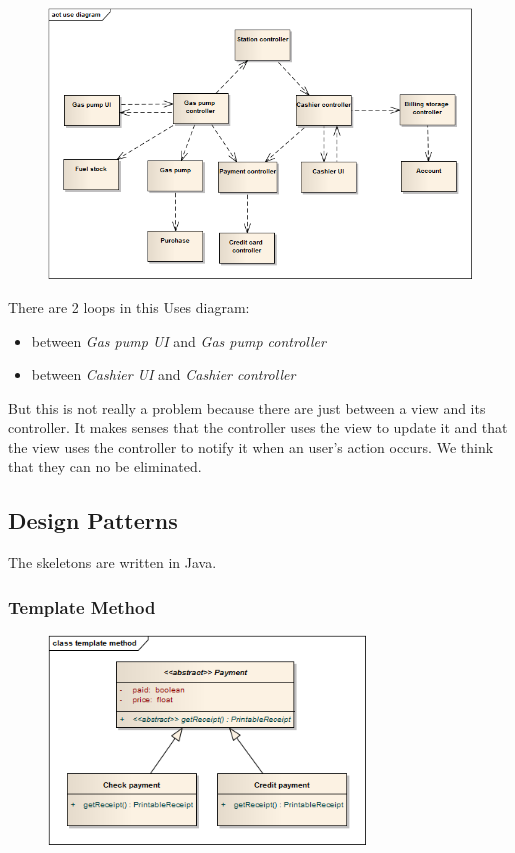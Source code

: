\begin{figure}[H]
 \centering
 \includegraphics[width=\textwidth]{../useDiagram.png}
\end{figure}
There are 2 loops in this Uses diagram:
\begin{itemize}
	\item between \textit{Gas pump UI} and \textit{Gas pump controller}
	\item between \textit{Cashier UI} and \textit{Cashier controller}
\end{itemize}
But this is not really a problem because there are just between a view and its controller. It makes senses that the controller uses the view to update it and that the view uses the controller to notify it when an user's action occurs. We think that they can no be eliminated.


\subsection{Design Patterns}
The skeletons are written in Java.

\subsubsection{Template Method}
\begin{figure}[H]
 \centering
 \includegraphics[width=0.75\textwidth]{../templateMethod.png}
\end{figure}

